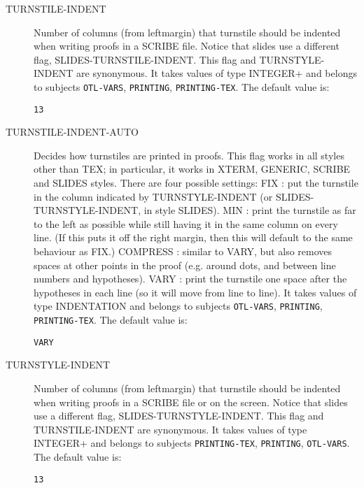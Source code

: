 \begin{description}
\item[TURNSTILE-INDENT]  
Number of columns (from leftmargin) that turnstile should be 
indented when writing proofs in a SCRIBE file. Notice that slides use 
a different flag, SLIDES-TURNSTILE-INDENT.
This flag and TURNSTYLE-INDENT are synonymous.
It takes values of type INTEGER+ and belongs to subjects \texttt{OTL-VARS}, \texttt{PRINTING}, \texttt{PRINTING-TEX}.  The default value is: \begin{lstlisting}
13
\end{lstlisting}

\item[TURNSTILE-INDENT-AUTO]  
Decides how turnstiles are printed in proofs. This flag works in
all styles other than TEX; in particular, it works in XTERM, GENERIC, 
SCRIBE and SLIDES styles. There are four possible settings:
FIX : put the turnstile in the column indicated by TURNSTYLE-INDENT 
      (or SLIDES-TURNSTYLE-INDENT, in style SLIDES).
MIN : print the turnstile as far to the left as possible while still having
      it in the same column on every line.  (If this puts it off the right 
      margin, then this will default to the same behaviour as FIX.)
COMPRESS : similar to VARY, but also removes spaces at other points in the
           proof (e.g. around dots, and between line numbers and hypotheses).
VARY : print the turnstile one space after the hypotheses in each line
       (so it will move from line to line).
It takes values of type INDENTATION and belongs to subjects \texttt{OTL-VARS}, \texttt{PRINTING}, \texttt{PRINTING-TEX}.  The default value is: \begin{lstlisting}
VARY
\end{lstlisting}

\item[TURNSTYLE-INDENT]  
Number of columns (from leftmargin) that turnstile should be 
indented when writing proofs in a SCRIBE file or on the screen. Notice 
that slides use a different flag, SLIDES-TURNSTYLE-INDENT.
This flag and TURNSTILE-INDENT are synonymous.
It takes values of type INTEGER+ and belongs to subjects \texttt{PRINTING-TEX}, \texttt{PRINTING}, \texttt{OTL-VARS}.  The default value is: \begin{lstlisting}
13
\end{lstlisting}


\end{description}
